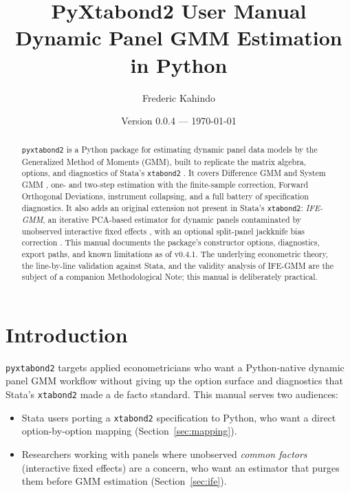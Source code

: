 \documentclass[11pt,a4paper]{article}
\title{\textbf{PyXtabond2 User Manual}\\[0.4em]\Large Dynamic Panel GMM Estimation in Python}
\author{Frederic Kahindo}
\date{Version 0.0.4 --- \today}
\newcommand{\pkg}{\texttt{pyxtabond2}}
\begin{document}
\maketitle

\begin{abstract}
\noindent \pkg{} is a Python package for estimating dynamic panel data
models by the Generalized Method of Moments (GMM), built to replicate the
matrix algebra, options, and diagnostics of Stata's \texttt{xtabond2}
\citep{Roodman2009a}. It covers Difference GMM \citep{ArellanoBond1991} and
System GMM \citep{ArellanoBover1995, BlundellBond1998}, one- and two-step
estimation with the \citet{Windmeijer2005} finite-sample correction, Forward
Orthogonal Deviations, instrument collapsing, and a full battery of
specification diagnostics. It also adds an original extension not present in
Stata's \texttt{xtabond2}: \emph{IFE-GMM}, an iterative PCA-based estimator
for dynamic panels contaminated by unobserved interactive fixed effects
\citep{Bai2009}, with an optional split-panel jackknife bias correction
\citep{DhaeneJochmans2015}. This manual documents the package's constructor options, diagnostics, export
paths, and known limitations as of v0.4.1. The underlying econometric theory, the line-by-line
validation against Stata, and the validity analysis of IFE-GMM are the
subject of a companion Methodological Note; this manual is deliberately
practical.
\end{abstract}

\tableofcontents

\section{Introduction}

\pkg{} targets applied econometricians who want a Python-native dynamic
panel GMM workflow without giving up the option surface and diagnostics that
Stata's \texttt{xtabond2} \citep{Roodman2009a} made a de facto standard. This
manual serves two audiences:

\begin{itemize}[nosep]
  \item Stata users porting a \texttt{xtabond2} specification to Python, who
        want a direct option-by-option mapping (Section~\ref{sec:mapping}).
  \item Researchers working with panels where unobserved \emph{common
        factors} (interactive fixed effects) are a concern, who want an
        estimator that purges them before GMM estimation (Section~\ref{sec:ife}).
\end{itemize}
\end{document}
